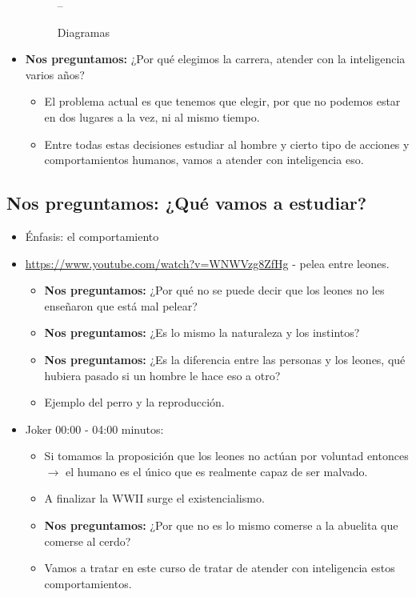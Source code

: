 \begin{itemize}
        \begin{figure}[htbp]
            \centering
            \caption{Diagramas}
            \label{}--
        \end{figure} 
    
    \item \textbf{Nos preguntamos:} ¿Por qué elegimos la carrera, atender con la inteligencia varios años? 
        \begin{itemize}
            \item El problema actual es que tenemos que elegir, por que no podemos estar en dos lugares a la vez, ni al mismo tiempo.
            \item Entre todas estas decisiones estudiar al hombre y cierto tipo de acciones y comportamientos humanos, vamos a atender con inteligencia eso.
        \end{itemize}

\end{itemize}


\subsection{\textbf{Nos preguntamos:} ¿Qué vamos a estudiar?}
\begin{itemize}
    \item Énfasis: el comportamiento
    \item \url{https://www.youtube.com/watch?v=WNWVzg8ZfHg} -  pelea entre leones.
        \begin{itemize}
            \item \textbf{Nos preguntamos:} ¿Por qué no se puede decir que los leones no les enseñaron que está mal pelear?
            \item \textbf{Nos preguntamos:} ¿Es lo mismo la naturaleza y los instintos?
            \item \textbf{Nos preguntamos:} ¿Es la diferencia entre las personas y los leones, qué hubiera pasado si un hombre le hace eso a otro?
            \item Ejemplo del perro y la reproducción.
        \end{itemize}
    \item Joker 00:00 - 04:00 minutos: 
        \begin{itemize}
            \item Si tomamos la proposición que los leones no actúan por voluntad entonces $\rightarrow$ el humano es el único que es realmente capaz de ser malvado.
            \item A finalizar la WWII surge el existencialismo.
            \item \textbf{Nos preguntamos:} ¿Por que no es lo mismo comerse a la abuelita que comerse al cerdo?
            \item Vamos a tratar en este curso de tratar de atender con inteligencia estos comportamientos.
        \end{itemize}
\end{itemize}

